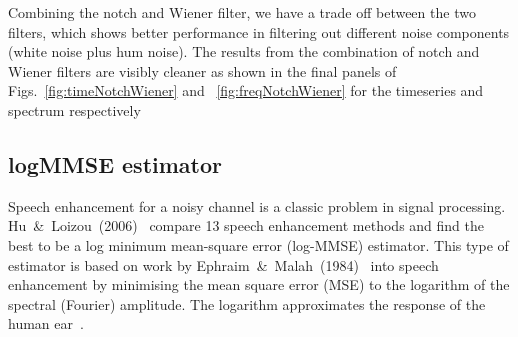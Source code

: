 \documentclass[paper-main.tex]{subfiles}
\begin{document}
Combining the notch and Wiener filter, we have a trade off between the two filters, which shows better performance in filtering out different noise components (white noise plus hum noise). 
The results from the combination of notch and Wiener filters are visibly cleaner as shown in the final panels of Figs.~\ref{fig:timeNotchWiener} and ~\ref{fig:freqNotchWiener} for the timeseries and spectrum respectively 













\subsection{logMMSE estimator}
\label{sec:logmmse}

Speech enhancement for a noisy channel is a classic problem in signal processing. 
Hu~\&~Loizou~(2006)~\cite{SubjectiveComparison} compare 13 speech enhancement methods and find the best to be a log minimum mean-square error (log-MMSE) estimator. 
This type of estimator is based on work by Ephraim~\&~Malah~(1984)~\cite{Ephraim1984SpeechEU_logMMSE} into speech enhancement by minimising the mean square error (MSE) to the logarithm of the spectral (Fourier) amplitude.
The logarithm approximates the response of the human ear~\cite{SubjectiveComparison}.
\end{document}
